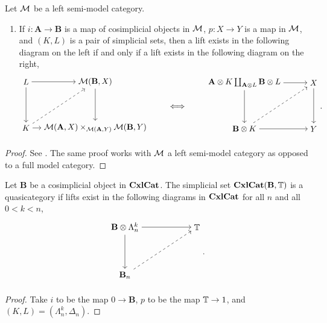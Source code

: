 \documentclass{amsart}
\begin{document}
\begin{prop}
    Let $\mathcal{M}$ be a left semi-model category.
    \begin{enumerate}
        \item If $i:\mathbf{A}\to\mathbf{B}$ is a map of cosimplicial objects in $\mathcal{M}$, $p:X\to Y$ is a map in $\mathcal{M}$, and $(K,L)$ is a pair of simplicial sets, then a lift exists in the following diagram on the left if and only if a lift exists in the following diagram on the right,
        \[\begin{matrix}\begin{tikzpicture}
            \node (A) at (0,0) {$L$};
            \node (X) at (3,0) {$\cM(\mathbf{B},X)$};
            \node (B) at (0,-2) {$K$};
            \node (Y) at (3,-2) {$\cM(\mathbf{A},X)\times_{\cM(\mathbf{A},Y)}\cM(\mathbf{B},Y)$};
            \draw[->] (A) to (B);
            \draw[->] (A) to (X);
            \draw[->] (X) to (Y);
            \draw[->] (B) to (Y);
            \draw[->, dashed] (B) to (X);
        \end{tikzpicture}\end{matrix}\qquad\iff\qquad
        \begin{matrix}\begin{tikzpicture}
            \node (A) at (0,0) {$\mathbf{A}\otimes K\coprod_{\mathbf{A}\otimes L}\mathbf{B}\otimes L$};
            \node (X) at (3,0) {$X$};
            \node (B) at (0,-2) {$\mathbf{B}\otimes K$};
            \node (Y) at (3,-2) {$Y$};
            \draw[->] (A) to (B);
            \draw[->] (A) to (X);
            \draw[->] (X) to (Y);
            \draw[->] (B) to (Y);
            \draw[->, dashed] (B) to (X);
        \end{tikzpicture}\end{matrix}.\]
    \end{enumerate}
\end{prop}
\begin{proof}
    See \cite[Prop. 16.4.5]{Hirshhorn}. The same proof works with $\mathcal{M}$ a left semi-model category as opposed to a full model category. 
\end{proof}

\begin{cor}
    Let $\mathbf{B}$ be a cosimplicial object in $\operatorname{\mathbf{CxlCat}}$. The simplicial set $\operatorname{\mathbf{CxlCat}}(\mathbf{B},\mathbb{T})$ is a quasicategory if lifts exist in the following diagrams in $\operatorname{\mathbf{CxlCat}}$ for all $n$ and all $0<k<n$,
    \[\begin{matrix}\begin{tikzpicture}
        \node (A) at (0,0) {$\mathbf{B}\otimes\Lambda_n^k$};
        \node (X) at (3,0) {$\T$};
        \node (B) at (0,-2) {$\mathbf{B}_n$};
        \draw[->] (A) to (B);
        \draw[->] (A) to (X);
        \draw[->, dashed] (B) to (X);
    \end{tikzpicture}\end{matrix}.\]
\end{cor}
\begin{proof}
    Take $i$ to be the map $0\to\mathbf{B}$, $p$ to be the map $\mathbb{T}\to1$, and $(K,L)=(\Lambda_n^k,\Delta_n)$.
\end{proof}

\newpage


\end{document}

